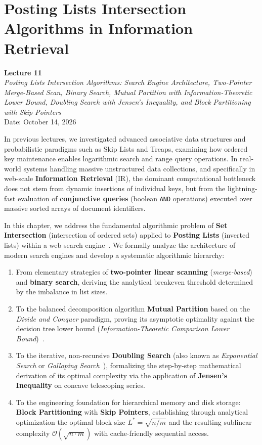 \chapter{Posting Lists Intersection Algorithms in Information Retrieval}
\label{chap:posting-lists-intersection-en}

\begin{center}
  \textbf{Lecture 11}\\
  \emph{Posting Lists Intersection Algorithms: Search Engine Architecture, Two-Pointer Merge-Based Scan, Binary Search, Mutual Partition with Information-Theoretic Lower Bound, Doubling Search with Jensen's Inequality, and Block Partitioning with Skip Pointers}\\[0.5em]
  Date: October 14, 2026
\end{center}

In previous lectures, we investigated advanced associative data structures and probabilistic paradigms such as Skip Lists and Treaps, examining how ordered key maintenance enables logarithmic search and range query operations. In real-world systems handling massive unstructured data collections, and specifically in web-scale \textbf{Information Retrieval} (IR), the dominant computational bottleneck does not stem from dynamic insertions of individual keys, but from the lightning-fast evaluation of \textbf{conjunctive queries} (boolean \texttt{AND} operations) executed over massive sorted arrays of document identifiers.

In this chapter, we address the fundamental algorithmic problem of \textbf{Set Intersection} (intersection of ordered sets) applied to \textbf{Posting Lists} (inverted lists) within a web search engine~\cite{manning2008,moffat1996}. We formally analyze the architecture of modern search engines and develop a systematic algorithmic hierarchy:
\begin{enumerate}
  \item From elementary strategies of \textbf{two-pointer linear scanning} (\textit{merge-based}) and \textbf{binary search}, deriving the analytical breakeven threshold determined by the imbalance in list sizes.
  \item To the balanced decomposition algorithm \textbf{Mutual Partition} based on the \textit{Divide and Conquer} paradigm, proving its asymptotic optimality against the decision tree lower bound (\textit{Information-Theoretic Comparison Lower Bound})~\cite{baezayates2004,demaine2000}.
  \item To the iterative, non-recursive \textbf{Doubling Search} (also known as \textit{Exponential Search} or \textit{Galloping Search}~\cite{bentley1976}), formalizing the step-by-step mathematical derivation of its optimal complexity via the application of \textbf{Jensen's Inequality} on concave telescoping series.
  \item To the engineering foundation for hierarchical memory and disk storage: \textbf{Block Partitioning} with \textbf{Skip Pointers}, establishing through analytical optimization the optimal block size $L^* = \sqrt{n/m}$ and the resulting sublinear complexity $\mathcal{O}(\sqrt{n \cdot m})$ with cache-friendly sequential access.
\end{enumerate}

